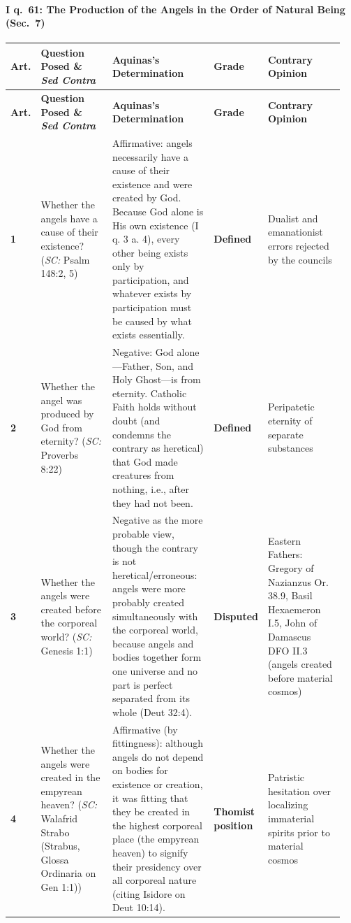 \paragraph{I q.~61: The Production of the Angels in the Order of Natural Being (Sec.~7)}
{\scriptsize
\setlength{\tabcolsep}{2.5pt}
\renewcommand{\arraystretch}{1.15}
\begin{longtable}{>{\raggedright\arraybackslash}p{0.05\linewidth}>{\raggedright\arraybackslash}p{0.23\linewidth}>{\raggedright\arraybackslash}p{0.31\linewidth}>{\raggedright\arraybackslash}p{0.12\linewidth}>{\raggedright\arraybackslash}p{0.24\linewidth}}
\toprule
\textbf{Art.} & \textbf{Question Posed \& \emph{Sed Contra}} & \textbf{Aquinas's Determination} & \textbf{Grade} & \textbf{Contrary Opinion} \\
\midrule
\endfirsthead
\toprule
\textbf{Art.} & \textbf{Question Posed \& \emph{Sed Contra}} & \textbf{Aquinas's Determination} & \textbf{Grade} & \textbf{Contrary Opinion} \\
\midrule
\endhead
\bottomrule
\endfoot
\textbf{1} & Whether the angels have a cause of their existence? (\emph{SC:} Psalm 148:2, 5) & Affirmative: angels necessarily have a cause of their existence and were created by God. Because God alone is His own existence (I q. 3 a. 4), every other being exists only by participation, and whatever exists by participation must be caused by what exists essentially. & \textbf{Defined} & Dualist and emanationist errors rejected by the councils \\
\addlinespace[1.5pt]
\textbf{2} & Whether the angel was produced by God from eternity? (\emph{SC:} Proverbs 8:22) & Negative: God alone---Father, Son, and Holy Ghost---is from eternity. Catholic Faith holds without doubt (and condemns the contrary as heretical) that God made creatures from nothing, i.e., after they had not been. & \textbf{Defined} & Peripatetic eternity of separate substances \\
\addlinespace[1.5pt]
\textbf{3} & Whether the angels were created before the corporeal world? (\emph{SC:} Genesis 1:1) & Negative as the more probable view, though the contrary is not heretical/erroneous: angels were more probably created simultaneously with the corporeal world, because angels and bodies together form one universe and no part is perfect separated from its whole (Deut 32:4). & \textbf{Disputed} & Eastern Fathers: Gregory of Nazianzus Or. 38.9, Basil Hexaemeron I.5, John of Damascus DFO II.3 (angels created before material cosmos) \\
\addlinespace[1.5pt]
\textbf{4} & Whether the angels were created in the empyrean heaven? (\emph{SC:} Walafrid Strabo (Strabus, Glossa Ordinaria on Gen 1:1)) & Affirmative (by fittingness): although angels do not depend on bodies for existence or creation, it was fitting that they be created in the highest corporeal place (the empyrean heaven) to signify their presidency over all corporeal nature (citing Isidore on Deut 10:14). & \textbf{Thomist position} & Patristic hesitation over localizing immaterial spirits prior to material cosmos \\
\end{longtable}
}

